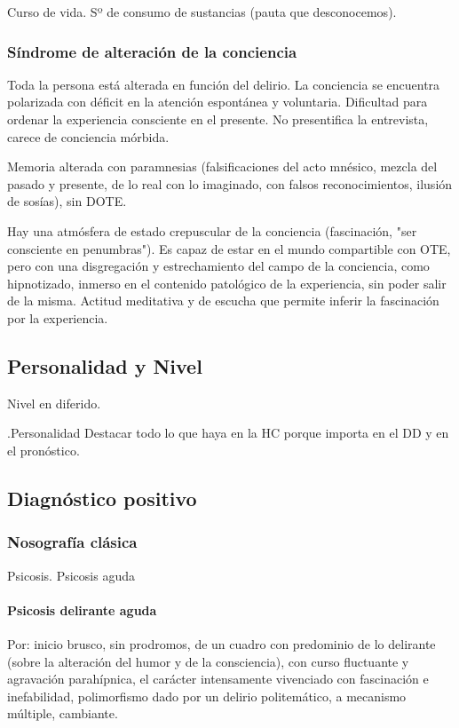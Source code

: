 Curso de vida. Sº de consumo de sustancias (pauta que desconocemos).
\subsubsection*{Síndrome de alteración de la conciencia}
Toda la persona está alterada en función del delirio. La conciencia se encuentra polarizada con déficit en la atención espontánea y voluntaria. Dificultad para ordenar la experiencia consciente en el presente. No presentifica la entrevista, carece de conciencia mórbida.

Memoria alterada con paramnesias (falsificaciones del acto mnésico, mezcla del pasado y presente, de lo real con lo imaginado, con falsos reconocimientos, ilusión de sosías), sin DOTE.

Hay una atmósfera de estado crepuscular de la conciencia (fascinación, "ser consciente en penumbras"). Es capaz de estar en el mundo compartible con OTE, pero con una disgregación y estrechamiento del campo de la conciencia, como hipnotizado, inmerso en el contenido patológico de la experiencia, sin poder salir de la misma. Actitud meditativa y de escucha que permite inferir la fascinación por la experiencia.
\subsection*{Personalidad y Nivel}

\faPaste Nivel en diferido.

.Personalidad
Destacar todo lo que haya en la HC porque importa en el DD y en el pronóstico.

\subsection*{Diagnóstico positivo}
\subsubsection*{Nosografía clásica}
\faPaste Psicosis.
\faPaste Psicosis aguda
\paragraph{Psicosis delirante aguda}
Por: inicio brusco, sin prodromos, de un cuadro con predominio de lo delirante (sobre la alteración del humor y de la consciencia), con curso fluctuante y agravación parahípnica, el carácter intensamente vivenciado con fascinación e inefabilidad, polimorfismo dado por un delirio politemático, a mecanismo múltiple, cambiante.
